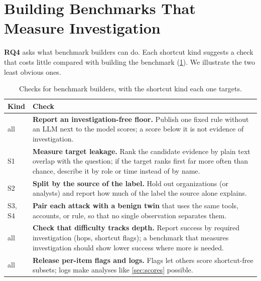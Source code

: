 \section{Building Benchmarks That Measure Investigation}
\label{sec:design}

\textbf{RQ4} asks what benchmark builders can do. Each shortcut kind suggests a check that costs little compared with building the benchmark (\cref{tab:checklist}). We illustrate the two least obvious ones.

\begin{table}[t]
  \caption{Checks for benchmark builders, with the shortcut kind each one targets.}
  \label{tab:checklist}
  \centering\footnotesize
  \begin{tabular}{@{}>{\raggedright\arraybackslash}p{0.55cm}>{\raggedright\arraybackslash}p{7.25cm}@{}}
    \toprule
    Kind & Check \\
    \midrule
    all & \textbf{Report an investigation-free floor.} Publish one fixed rule without an LLM next to the model scores; a score below it is not evidence of investigation. \\
    S1 & \textbf{Measure target leakage.} Rank the candidate evidence by plain text overlap with the question; if the target ranks first far more often than chance, describe it by role or time instead of by name. \\
    S2 & \textbf{Split by the source of the label.} Hold out organizations (or analysts) and report how much of the label the source alone explains. \\
    S3, S4 & \textbf{Pair each attack with a benign twin} that uses the same tools, accounts, or rule, so that no single observation separates them. \\
    all & \textbf{Check that difficulty tracks depth.} Report success by required investigation (hops, shortcut flags); a benchmark that measures investigation should show lower success where more is needed. \\
    all & \textbf{Release per-item flags and logs.} Flags let others score shortcut-free subsets; logs make analyses like \cref{sec:scores} possible. \\
    \bottomrule
  \end{tabular}
\end{table}

